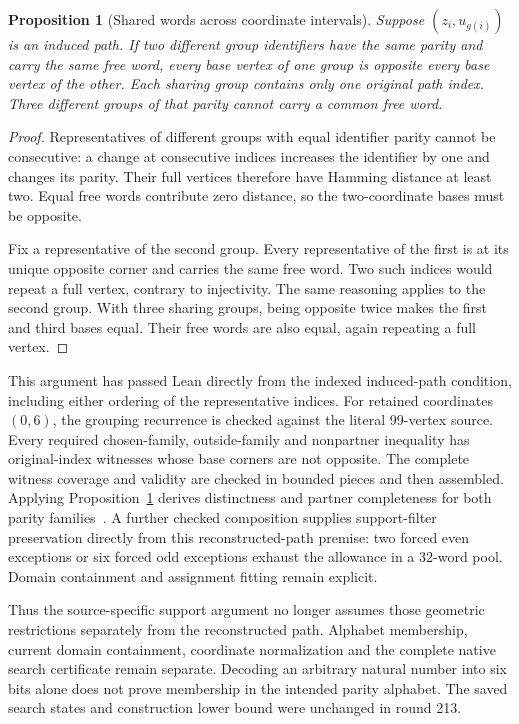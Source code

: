 \documentclass[11pt,a4paper]{article}
\newtheorem{proposition}[theorem]{Proposition}
\theoremstyle{definition}
\theoremstyle{remark}
\begin{document}
\begin{proposition}[Shared words across coordinate intervals]\label{prop:interval213}
Suppose $(z_i,u_{g(i)})$ is an induced path. If two different group
identifiers have the same parity and carry the same free word, every
base vertex of one group is opposite every base vertex of the other.
Each sharing group contains only one original path index. Three
different groups of that parity cannot carry a common free word.
\end{proposition}
\begin{proof}
Representatives of different groups with equal identifier parity cannot
be consecutive: a change at consecutive indices increases the identifier
by one and changes its parity. Their full vertices therefore have Hamming
distance at least two. Equal free words contribute zero distance, so the
two-coordinate bases must be opposite.

Fix a representative of the second group. Every representative of the
first is at its unique opposite corner and carries the same free word.
Two such indices would repeat a full vertex, contrary to injectivity.
The same reasoning applies to the second group. With three sharing
groups, being opposite twice makes the first and third bases equal.
Their free words are also equal, again repeating a full vertex.
\end{proof}

This argument has passed Lean directly from the indexed induced-path
condition, including either ordering of the representative indices.
For retained coordinates $(0,6)$, the grouping recurrence is checked
against the literal 99-vertex source. Every required chosen-family,
outside-family and nonpartner inequality has original-index witnesses
whose base corners are not opposite. The complete witness coverage
and validity are checked in bounded pieces and then assembled.
Applying Proposition~\ref{prop:interval213} derives distinctness and
partner completeness for both parity families~\cite{research213}.
A further checked composition supplies support-filter preservation
directly from this reconstructed-path premise: two forced even
exceptions or six forced odd exceptions exhaust the allowance in a
32-word pool. Domain containment and assignment fitting remain explicit.

Thus the source-specific support argument no longer assumes those
geometric restrictions separately from the reconstructed path.
Alphabet membership, current domain containment, coordinate
normalization and the complete native search certificate remain separate.
Decoding an arbitrary natural number into six bits alone does not prove
membership in the intended parity alphabet. The saved search states and
construction lower bound were unchanged in round 213.
\end{document}
